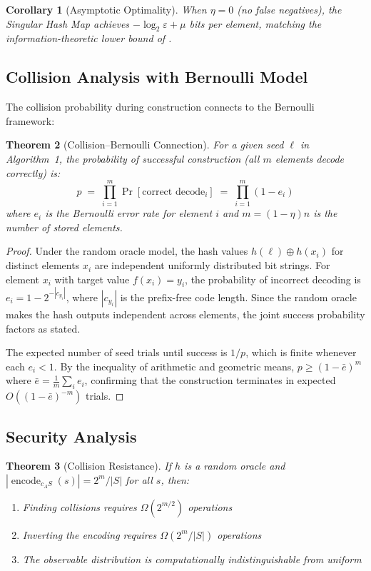 \documentclass[11pt]{article}
\theoremstyle{definition}
\theoremstyle{plain}
\newtheorem{theorem}{Theorem}[section]
\newtheorem{corollary}[theorem]{Corollary}
\theoremstyle{remark}
\newcommand{\cipher}[1]{c_{#1}}
\newcommand{\encode}{\operatorname{encode}}
\begin{document}
\begin{corollary}[Asymptotic Optimality]
\label{cor:asymptotic-optimal}
When $\eta = 0$ (no false negatives), the Singular Hash Map achieves $-\log_2 \varepsilon + \mu$ bits per element, matching the information-theoretic lower bound of .
\end{corollary}

\subsection{Collision Analysis with Bernoulli Model}

The collision probability during construction connects to the Bernoulli framework:

\begin{theorem}[Collision--Bernoulli Connection]
\label{thm:collision-bernoulli}
For a given seed $\ell$ in Algorithm~1, the probability of successful construction (all $m$ elements decode correctly) is:
$$p \;=\; \prod_{i=1}^{m} \Pr[\text{correct decode}_i] \;=\; \prod_{i=1}^{m} (1 - e_i)$$
where $e_i$ is the Bernoulli error rate for element $i$ and $m = (1-\eta)n$ is the number of stored elements.
\end{theorem}

\begin{proof}
Under the random oracle model, the hash values $h(\ell) \oplus h(x_i)$ for distinct elements $x_i$ are independent uniformly distributed bit strings.
For element $x_i$ with target value $f(x_i) = y_i$, the probability of incorrect decoding is $e_i = 1 - 2^{-|c_{y_i}|}$, where $|c_{y_i}|$ is the prefix-free code length.
Since the random oracle makes the hash outputs independent across elements, the joint success probability factors as stated.

The expected number of seed trials until success is $1/p$, which is finite whenever each $e_i < 1$.
By the inequality of arithmetic and geometric means, $p \geq (1 - \bar{e})^m$ where $\bar{e} = \frac{1}{m}\sum_i e_i$, confirming that the construction terminates in expected $O((1-\bar{e})^{-m})$ trials.
\end{proof}

\subsection{Security Analysis}

\begin{theorem}[Collision Resistance]
\label{thm:collision-resistance}
If $h$ is a random oracle and $|\encode_{\cipher{A}S}(s)| = 2^m/|S|$ for all $s$, then:
\begin{enumerate}
\item Finding collisions requires $\Omega(2^{m/2})$ operations
\item Inverting the encoding requires $\Omega(2^m/|S|)$ operations
\item The observable distribution is computationally indistinguishable from uniform
\end{enumerate}
\end{theorem}
\end{document}
